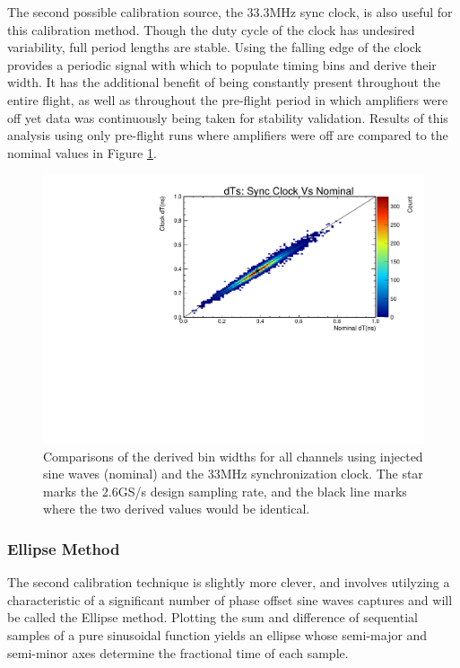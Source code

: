 		The second possible calibration source, the 33.3MHz sync clock, is also useful for this calibration method.  Though the duty cycle of the clock has undesired variability, full period lengths are stable.  Using the falling edge of the clock provides a periodic signal with which to populate timing bins and derive their width.  It has the additional benefit of being constantly present throughout the entire flight, as well as throughout the pre-flight period in which amplifiers were off yet data was continuously being taken for stability validation.  Results of this analysis using only pre-flight runs where amplifiers were off are compared to the nominal values in Figure \ref{fig:dTNominalVsSyncClock}.
		
		
	\begin{figure}
		\includegraphics[width=\textwidth]{figures/nominalDtVsSyncClockDt}
		\caption{Comparisons of the derived bin widths for all channels using injected sine waves (nominal) and the 33MHz synchronization clock.  The star marks the 2.6GS/s design sampling rate, and the black line marks where the two derived values would be identical.}
		\label{fig:dTNominalVsSyncClock}
	\end{figure}


	\subsubsection{Ellipse Method}	
		The second calibration technique is slightly more clever, and involves utilyzing a characteristic of a significant number of phase offset sine waves captures and will be called the Ellipse method.  Plotting the sum and difference of sequential samples of a pure sinusoidal function yields an ellipse whose semi-major and semi-minor axes determine the fractional time of each sample.  
		
